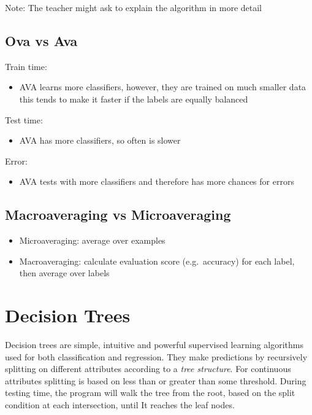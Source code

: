 \documentclass[11pt]{article}
\begin{document}
Note: The teacher might ask to explain the algorithm in more detail

\subsection{Ova vs Ava}\label{ova-vs-ava}

Train time:

\begin{itemize}
\tightlist
\item
  AVA learns more classifiers, however, they are trained on much smaller
  data this tends to make it faster if the labels are equally balanced
\end{itemize}

Test time:

\begin{itemize}
\tightlist
\item
  AVA has more classifiers, so often is slower
\end{itemize}

Error:

\begin{itemize}
\tightlist
\item
  AVA tests with more classifiers and therefore has more chances for
  errors
\end{itemize}

\subsection{Macroaveraging vs
Microaveraging}\label{macroaveraging-vs-microaveraging}

\begin{itemize}
\tightlist
\item
  Microaveraging: average over examples
\item
  Macroaveraging: calculate evaluation score (e.g.~accuracy) for each
  label, then average over labels
\end{itemize}

\section{Decision Trees}\label{decision-trees}

Decision trees are simple, intuitive and powerful supervised learning
algorithms used for both classification and regression. They make
predictions by recursively splitting on different attributes according
to a \emph{tree structure}. For continuous attributes splitting is based
on less than or greater than some threshold. During testing time, the
program will walk the tree from the root, based on the split condition
at each intersection, until It reaches the leaf nodes.
\end{document}

